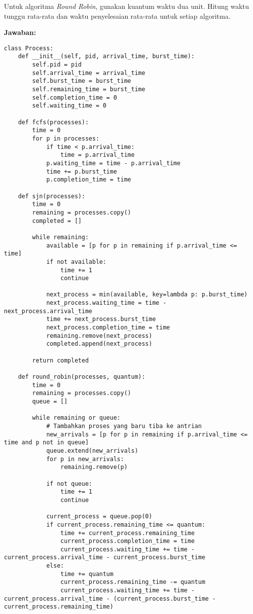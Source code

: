 \documentclass[12pt]{article}
\begin{document}
Untuk algoritma \textit{Round Robin}, gunakan kuantum waktu dua unit. Hitung waktu tunggu rata-rata dan waktu penyelesaian rata-rata untuk setiap algoritma.

\textbf{Jawaban:}
\begin{lstlisting}
class Process:
    def __init__(self, pid, arrival_time, burst_time):
        self.pid = pid
        self.arrival_time = arrival_time
        self.burst_time = burst_time
        self.remaining_time = burst_time
        self.completion_time = 0
        self.waiting_time = 0

    def fcfs(processes):
        time = 0
        for p in processes:
            if time < p.arrival_time:
                time = p.arrival_time
            p.waiting_time = time - p.arrival_time
            time += p.burst_time
            p.completion_time = time

    def sjn(processes):
        time = 0
        remaining = processes.copy()
        completed = []
        
        while remaining:
            available = [p for p in remaining if p.arrival_time <= time]
            if not available:
                time += 1
                continue
            
            next_process = min(available, key=lambda p: p.burst_time)
            next_process.waiting_time = time - next_process.arrival_time
            time += next_process.burst_time
            next_process.completion_time = time
            remaining.remove(next_process)
            completed.append(next_process)
        
        return completed

    def round_robin(processes, quantum):
        time = 0
        remaining = processes.copy()
        queue = []
        
        while remaining or queue:
            # Tambahkan proses yang baru tiba ke antrian
            new_arrivals = [p for p in remaining if p.arrival_time <= time and p not in queue]
            queue.extend(new_arrivals)
            for p in new_arrivals:
                remaining.remove(p)
            
            if not queue:
                time += 1
                continue
            
            current_process = queue.pop(0)
            if current_process.remaining_time <= quantum:
                time += current_process.remaining_time
                current_process.completion_time = time
                current_process.waiting_time += time - current_process.arrival_time - current_process.burst_time
            else:
                time += quantum
                current_process.remaining_time -= quantum
                current_process.waiting_time += time - current_process.arrival_time - (current_process.burst_time - current_process.remaining_time)
                

\end{lstlisting}
\end{document}
